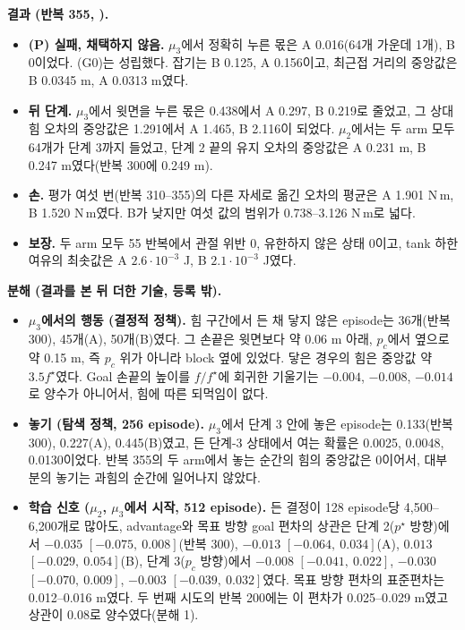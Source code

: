 \documentclass[11pt]{article}\usepackage[margin=1in]{geometry}\usepackage{amsmath,amssymb,amsthm,mathtools}\usepackage{graphicx}\graphicspath{{figures/}{../figures/}{figs/}{./}}\usepackage{enumitem}\usepackage{hyperref}\usepackage{cleveref}\usepackage{tikz}\usetikzlibrary{arrows.meta,positioning,calc,shapes.geometric}\usepackage{float}\usepackage{rotating}\usepackage[most]{tcolorbox}\usepackage{kotex}\usepackage{booktabs}\usepackage{longtable}\emergencystretch=1.6em\tolerance=2000 \crefname{assumption}{Assumption}{Assumptions}\Crefname{assumption}{Assumption}{Assumptions}\crefname{definition}{Definition}{Definitions}\Crefname{definition}{Definition}{Definitions}\crefname{proposition}{Proposition}{Propositions}\Crefname{proposition}{Proposition}{Propositions}\crefname{fact}{Fact}{Facts}\Crefname{fact}{Fact}{Facts} \newtheorem{assumption}{Assumption}\newtheorem{definition}{Definition}\newtheorem{lemma}{Lemma}\newtheorem{proposition}{Proposition}\newtheorem{theorem}{Theorem}\newtheorem{corollary}{Corollary}\newtheorem{fact}{Fact}\theoremstyle{remark}\newtheorem{remark}{Remark} \newcommand{\R}{\mathbb{R}}\newcommand{\xb}{\bar x}\newcommand{\Ab}{\bar A}\newcommand{\By}{\bar B_y}\newcommand{\U}{\mathcal U}\newcommand{\Z}{\mathcal Z}
\begin{document}
\textbf{결과 (반복 355, ).}
\begin{itemize}
\item \textbf{(P) 실패, 채택하지 않음.} $\mu_3$에서 정확히 누른 몫은 A 0.016(64개 가운데 1개), B 0이었다. (G0)는 성립했다. 잡기는 B 0.125, A 0.156이고, 최근접 거리의 중앙값은 B 0.0345 m, A 0.0313 m였다.
\item \textbf{뒤 단계.} $\mu_3$에서 윗면을 누른 몫은 0.438에서 A 0.297, B 0.219로 줄었고, 그 상대 힘 오차의 중앙값은 1.291에서 A 1.465, B 2.116이 되었다. $\mu_2$에서는 두 arm 모두 64개가 단계 3까지 들었고, 단계 2 끝의 유지 오차의 중앙값은 A 0.231 m, B 0.247 m였다(반복 300에 0.249 m).
\item \textbf{손.} 평가 여섯 번(반복 310--355)의 다른 자세로 옮긴 오차의 평균은 A 1.901 N\,m, B 1.520 N\,m였다. B가 낮지만 여섯 값의 범위가 0.738--3.126 N\,m로 넓다.
\item \textbf{보장.} 두 arm 모두 55 반복에서 관절 위반 0, 유한하지 않은 상태 0이고, tank 하한 여유의 최솟값은 A $2.6\cdot10^{-3}$ J, B $2.1\cdot10^{-3}$ J였다.
\end{itemize}

\textbf{분해 (결과를 본 뒤 더한 기술, 등록 밖).}
\begin{itemize}
\item \textbf{$\mu_3$에서의 행동 (결정적 정책).} 힘 구간에서 든 채 닿지 않은 episode는 36개(반복 300), 45개(A), 50개(B)였다. 그 손끝은 윗면보다 약 0.06 m 아래, $p_c$에서 옆으로 약 0.15 m, 즉 $p_c$ 위가 아니라 block 옆에 있었다. 닿은 경우의 힘은 중앙값 약 $3.5f^\star$였다. Goal 손끝의 높이를 $f/f^\star$에 회귀한 기울기는 $-0.004$, $-0.008$, $-0.014$로 양수가 아니어서, 힘에 따른 되먹임이 없다.
\item \textbf{놓기 (탐색 정책, 256 episode).} $\mu_3$에서 단계 3 안에 놓은 episode는 0.133(반복 300), 0.227(A), 0.445(B)였고, 든 단계-3 상태에서 여는 확률은 0.0025, 0.0048, 0.0130이었다. 반복 355의 두 arm에서 놓는 순간의 힘의 중앙값은 0이어서, 대부분의 놓기는 과힘의 순간에 일어나지 않았다.
\item \textbf{학습 신호 ($\mu_2$, $\mu_3$에서 시작, 512 episode).} 든 결정이 128 episode당 4{,}500--6{,}200개로 많아도, advantage와 목표 방향 goal 편차의 상관은 단계 2($p^\star$ 방향)에서 $-0.035$ $[-0.075,\ 0.008]$(반복 300), $-0.013$ $[-0.064,\ 0.034]$(A), $0.013$ $[-0.029,\ 0.054]$(B), 단계 3($p_c$ 방향)에서 $-0.008$ $[-0.041,\ 0.022]$, $-0.030$ $[-0.070,\ 0.009]$, $-0.003$ $[-0.039,\ 0.032]$였다. 목표 방향 편차의 표준편차는 0.012--0.016 m였다. 두 번째 시도의 반복 200에는 이 편차가 0.025--0.029 m였고 상관이 0.08로 양수였다(분해 1).
\end{itemize}
\end{document}

